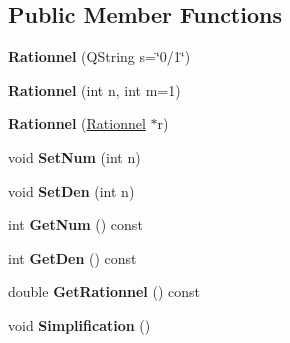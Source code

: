 \subsection*{Public Member Functions}
\begin{DoxyCompactItemize}
\item 
\hypertarget{class_calcul_1_1_rationnel_ac00a14054204cc5ea425c13ca6b68f8a}{{\bfseries Rationnel} (Q\-String s=\char`\"{}0/1\char`\"{})}\label{class_calcul_1_1_rationnel_ac00a14054204cc5ea425c13ca6b68f8a}

\item 
\hypertarget{class_calcul_1_1_rationnel_a9591906d6ed8040bf476afd8664cf29b}{{\bfseries Rationnel} (int n, int m=1)}\label{class_calcul_1_1_rationnel_a9591906d6ed8040bf476afd8664cf29b}

\item 
\hypertarget{class_calcul_1_1_rationnel_a1864157c6d295746a860363f2fe49572}{{\bfseries Rationnel} (\hyperlink{class_calcul_1_1_rationnel}{Rationnel} $\ast$r)}\label{class_calcul_1_1_rationnel_a1864157c6d295746a860363f2fe49572}

\item 
\hypertarget{class_calcul_1_1_rationnel_af6012e3151fddb2b27c50234a24ed30c}{void {\bfseries Set\-Num} (int n)}\label{class_calcul_1_1_rationnel_af6012e3151fddb2b27c50234a24ed30c}

\item 
\hypertarget{class_calcul_1_1_rationnel_ad184a895103274c732df6011a7d7e395}{void {\bfseries Set\-Den} (int n)}\label{class_calcul_1_1_rationnel_ad184a895103274c732df6011a7d7e395}

\item 
\hypertarget{class_calcul_1_1_rationnel_a7ec6d7a179032dd0008d216b7043a2df}{int {\bfseries Get\-Num} () const }\label{class_calcul_1_1_rationnel_a7ec6d7a179032dd0008d216b7043a2df}

\item 
\hypertarget{class_calcul_1_1_rationnel_abd1a6579f6fddfc99560fe3f106c3801}{int {\bfseries Get\-Den} () const }\label{class_calcul_1_1_rationnel_abd1a6579f6fddfc99560fe3f106c3801}

\item 
\hypertarget{class_calcul_1_1_rationnel_a96d32671b363d958578bb0c72f3ea20c}{double {\bfseries Get\-Rationnel} () const }\label{class_calcul_1_1_rationnel_a96d32671b363d958578bb0c72f3ea20c}

\item 
\hypertarget{class_calcul_1_1_rationnel_a235c633052410be850cadc514f8a906b}{void {\bfseries Simplification} ()}\label{class_calcul_1_1_rationnel_a235c633052410be850cadc514f8a906b}


\end{DoxyCompactItemize}
